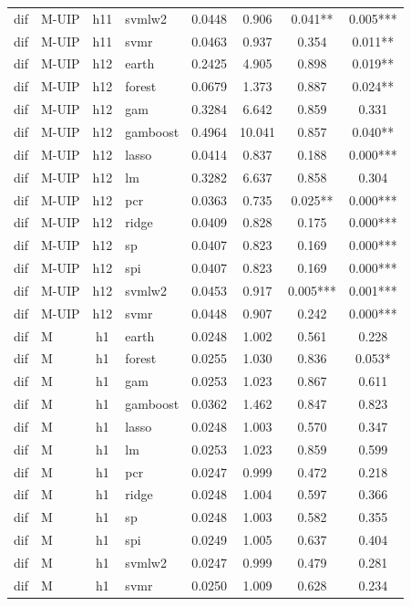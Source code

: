 \begin{ThreePartTable}
\begin{longtable}[t]{llclcccc}
dif & M-UIP & h11 & svmlw2 & 0.0448 & 0.906 & 0.041** & 0.005***\\
dif & M-UIP & h11 & svmr & 0.0463 & 0.937 & 0.354 & 0.011**\\
\addlinespace
dif & M-UIP & h12 & earth & 0.2425 & 4.905 & 0.898 & 0.019**\\
dif & M-UIP & h12 & forest & 0.0679 & 1.373 & 0.887 & 0.024**\\
dif & M-UIP & h12 & gam & 0.3284 & 6.642 & 0.859 & 0.331\\
dif & M-UIP & h12 & gamboost & 0.4964 & 10.041 & 0.857 & 0.040**\\
dif & M-UIP & h12 & lasso & 0.0414 & 0.837 & 0.188 & 0.000***\\
dif & M-UIP & h12 & lm & 0.3282 & 6.637 & 0.858 & 0.304\\
dif & M-UIP & h12 & pcr & 0.0363 & 0.735 & 0.025** & 0.000***\\
dif & M-UIP & h12 & ridge & 0.0409 & 0.828 & 0.175 & 0.000***\\
dif & M-UIP & h12 & sp & 0.0407 & 0.823 & 0.169 & 0.000***\\
dif & M-UIP & h12 & spi & 0.0407 & 0.823 & 0.169 & 0.000***\\
dif & M-UIP & h12 & svmlw2 & 0.0453 & 0.917 & 0.005*** & 0.001***\\
dif & M-UIP & h12 & svmr & 0.0448 & 0.907 & 0.242 & 0.000***\\
\addlinespace
dif & M & h1 & earth & 0.0248 & 1.002 & 0.561 & 0.228\\
dif & M & h1 & forest & 0.0255 & 1.030 & 0.836 & 0.053*\\
dif & M & h1 & gam & 0.0253 & 1.023 & 0.867 & 0.611\\
dif & M & h1 & gamboost & 0.0362 & 1.462 & 0.847 & 0.823\\
dif & M & h1 & lasso & 0.0248 & 1.003 & 0.570 & 0.347\\
dif & M & h1 & lm & 0.0253 & 1.023 & 0.859 & 0.599\\
dif & M & h1 & pcr & 0.0247 & 0.999 & 0.472 & 0.218\\
dif & M & h1 & ridge & 0.0248 & 1.004 & 0.597 & 0.366\\
dif & M & h1 & sp & 0.0248 & 1.003 & 0.582 & 0.355\\
dif & M & h1 & spi & 0.0249 & 1.005 & 0.637 & 0.404\\
dif & M & h1 & svmlw2 & 0.0247 & 0.999 & 0.479 & 0.281\\
dif & M & h1 & svmr & 0.0250 & 1.009 & 0.628 & 0.234\\

\end{longtable}
\end{ThreePartTable}

